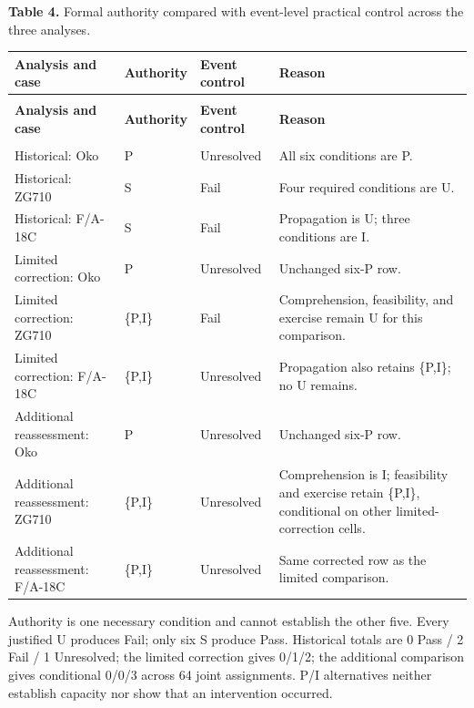 \documentclass[11pt]{article}
\renewcommand{\arraystretch}{1.10}
\newlength{\TAETableWidth}
\begin{document}
\label{table-4}
{\small \textcolor{TAENavy}{\textbf{Table 4.}} Formal authority compared with event-level practical control across the three analyses.\par}
\begingroup
\small
\setlength{\tabcolsep}{4pt}
\renewcommand{\arraystretch}{1.12}
\setlength{\TAETableWidth}{\dimexpr\linewidth-6\tabcolsep\relax}
\begin{longtable}{@{}>{\raggedright\arraybackslash}p{0.250\TAETableWidth}>{\centering\arraybackslash}p{0.100\TAETableWidth}>{\centering\arraybackslash}p{0.150\TAETableWidth}>{\raggedright\arraybackslash}p{0.500\TAETableWidth}@{}}
\toprule
\rowcolor{TAEPaleNavy}
\textcolor{TAENavy}{\textbf{Analysis and case}} & \textcolor{TAENavy}{\textbf{Authority}} & \textcolor{TAENavy}{\textbf{Event control}} & \textcolor{TAENavy}{\textbf{Reason}} \\
\midrule
\endfirsthead
\multicolumn{4}{@{}l}{\footnotesize Table 4 (continued)}\\
\toprule
\rowcolor{TAEPaleNavy}
\textcolor{TAENavy}{\textbf{Analysis and case}} & \textcolor{TAENavy}{\textbf{Authority}} & \textcolor{TAENavy}{\textbf{Event control}} & \textcolor{TAENavy}{\textbf{Reason}} \\
\midrule
\endhead
\midrule
\multicolumn{4}{r@{}}{\footnotesize Continued on next page}\\
\endfoot
\bottomrule
\endlastfoot
Historical: Oko & P & Unresolved & All six conditions are P. \\
Historical: ZG710 & S & Fail & Four required conditions are U. \\
Historical: F/A-18C & S & Fail & Propagation is U; three conditions are I. \\
Limited correction: Oko & P & Unresolved & Unchanged six-P row. \\
Limited correction: ZG710 & \{P,I\} & Fail & Comprehension, feasibility, and exercise remain U for this comparison. \\
Limited correction: F/A-18C & \{P,I\} & Unresolved & Propagation also retains \{P,I\}; no U remains. \\
Additional reassessment: Oko & P & Unresolved & Unchanged six-P row. \\
Additional reassessment: ZG710 & \{P,I\} & Unresolved & Comprehension is I; feasibility and exercise retain \{P,I\}, conditional on other limited-correction cells. \\
Additional reassessment: F/A-18C & \{P,I\} & Unresolved & Same corrected row as the limited comparison. \\
\end{longtable}
\endgroup
{\footnotesize\raggedright Authority is one necessary condition and cannot establish the other five. Every justified U produces Fail; only six S produce Pass. Historical totals are 0 Pass / 2 Fail / 1 Unresolved; the limited correction gives 0/1/2; the additional comparison gives conditional 0/0/3 across 64 joint assignments. P/I alternatives neither establish capacity nor show that an intervention occurred.\par}
\medskip
\end{document}
